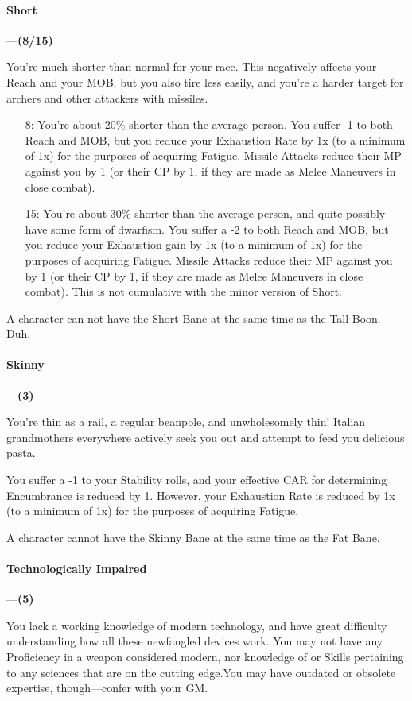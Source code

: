 \documentclass[oneside,11pt,english]{book}
\begin{document}
\paragraph{\label{bane:Short}Short}---\quad\textbf{(8/15) }\par
You're much shorter than normal for your race. This negatively affects your
Reach and your MOB, but you also tire less easily, and you're a harder target
for archers and other attackers with missiles. 
\begin{itemize}
\item [8:] You're about 20\% shorter than the average person. You suffer -1 to
  both Reach and MOB, but you reduce your Exhaustion Rate by 1x (to a minimum of
  1x) for the purposes of acquiring Fatigue. Missile Attacks reduce their MP
  against you by 1 (or their CP by 1, if they are made as Melee Maneuvers in
  close combat).  
\item [15:] You're about 30\% shorter than the average person, and quite
  possibly have some form of dwarfism. You suffer a -2 to both Reach and MOB,
  but you reduce your Exhaustion gain by 1x (to a minimum of 1x) for the
  purposes of acquiring Fatigue. Missile Attacks reduce their MP against you by
  1 (or their CP by 1, if they are made as Melee Maneuvers in close combat).
  This is not cumulative with the minor version of Short. 
\end{itemize}
A character can not have the Short Bane at the same time as the Tall Boon. Duh. 

\paragraph{\label{bane:Skinny}Skinny}---\quad\textbf{(3) }\par
You’re thin as a rail, a regular beanpole, and unwholesomely thin! Italian grandmothers everywhere 
actively seek you out and attempt to feed you delicious pasta.

You suffer a -1 to your Stability rolls, and your effective CAR for determining
Encumbrance is reduced by 1. However, your Exhaustion Rate is reduced by 1x (to
a minimum of 1x) for the purposes of acquiring Fatigue. 

A character cannot have the Skinny Bane at the same time as the Fat Bane.
\paragraph{\label{bane:Technologically Impaired}Technologically Impaired}---\quad\textbf{(5) }\par
You lack a working knowledge of modern technology, and have great difficulty understanding how all 
these newfangled devices work. You may not have any Proficiency in a weapon considered modern, nor 
knowledge of or Skills pertaining to any sciences that are on the cutting edge.You may have outdated or 
obsolete expertise, though—confer with your GM. 
\end{document}
